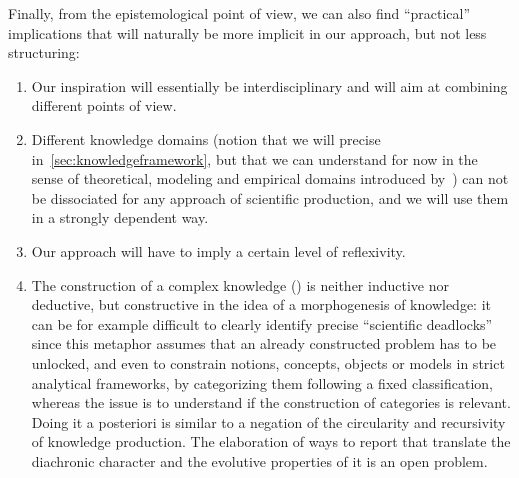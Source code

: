 Finally, from the epistemological point of view, we can also find ``practical'' implications that will naturally be more implicit in our approach, but not less structuring:

\begin{enumerate}
	\item Our inspiration will essentially be interdisciplinary and will aim at combining different points of view.
	\item Different knowledge domains (notion that we will precise in~\ref{sec:knowledgeframework}, but that we can understand for now in the sense of theoretical, modeling and empirical domains introduced by~\cite{livet2010}) can not be dissociated for any approach of scientific production, and we will use them in a strongly dependent way.
	\item Our approach will have to imply a certain level of reflexivity.
	\item The construction of a complex knowledge (\cite{morin1991methode}) is neither inductive nor deductive, but constructive in the idea of a morphogenesis of knowledge: it can be for example difficult to clearly identify precise ``scientific deadlocks'' since this metaphor assumes that an already constructed problem has to be unlocked, and even to constrain notions, concepts, objects or models in strict analytical frameworks, by categorizing them following a fixed classification, whereas the issue is to understand if the construction of categories is relevant. Doing it a posteriori is similar to a negation of the circularity and recursivity of knowledge production. The elaboration of ways to report that translate the diachronic character and the evolutive properties of it is an open problem.
\end{enumerate}















